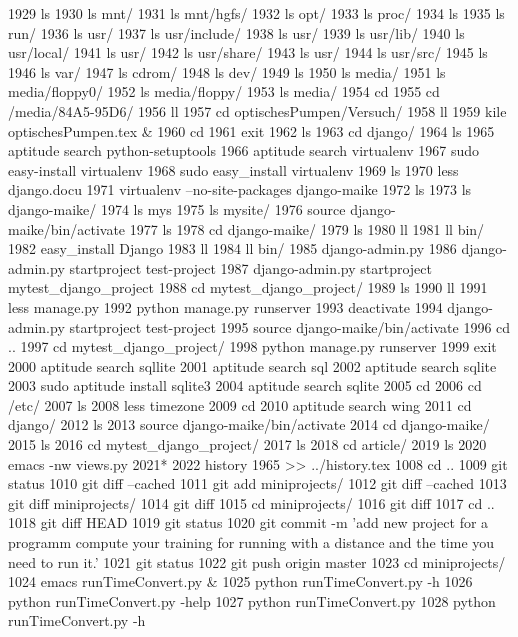  1929  ls
 1930  ls mnt/
 1931  ls mnt/hgfs/
 1932  ls opt/
 1933  ls proc/
 1934  ls
 1935  ls run/
 1936  ls usr/
 1937  ls usr/include/
 1938  ls usr/
 1939  ls usr/lib/
 1940  ls usr/local/
 1941  ls usr/
 1942  ls usr/share/
 1943  ls usr/
 1944  ls usr/src/
 1945  ls
 1946  ls var/
 1947  ls cdrom/
 1948  ls dev/
 1949  ls
 1950  ls media/
 1951  ls media/floppy0/
 1952  ls media/floppy/
 1953  ls media/
 1954  cd
 1955  cd /media/84A5-95D6/
 1956  ll
 1957  cd optischesPumpen/Versuch/
 1958  ll
 1959  kile optischesPumpen.tex &
 1960  cd
 1961  exit
 1962  ls 
 1963  cd django/
 1964  ls
 1965  aptitude search python-setuptools
 1966  aptitude search virtualenv
 1967  sudo easy-install virtualenv
 1968  sudo easy_install virtualenv
 1969  ls
 1970  less django.docu
 1971  virtualenv --no-site-packages django-maike
 1972  ls
 1973  ls django-maike/
 1974  ls mys
 1975  ls mysite/
 1976  source django-maike/bin/activate
 1977  ls
 1978  cd django-maike/
 1979  ls
 1980  ll
 1981  ll bin/
 1982  easy_install Django
 1983  ll
 1984  ll bin/
 1985  django-admin.py 
 1986  django-admin.py startproject test-project
 1987  django-admin.py startproject mytest_django_project
 1988  cd mytest_django_project/
 1989  ls
 1990  ll
 1991  less manage.py 
 1992  python manage.py runserver
 1993  deactivate
 1994  django-admin.py startproject test-project
 1995  source django-maike/bin/activate
 1996  cd ..
 1997  cd mytest_django_project/
 1998  python manage.py runserver
 1999  exit
 2000  aptitude search sqllite
 2001  aptitude search sql
 2002  aptitude search sqlite
 2003  sudo aptitude install sqlite3
 2004  aptitude search sqlite
 2005  cd
 2006  cd /etc/
 2007  ls
 2008  less timezone 
 2009  cd
 2010  aptitude search wing
 2011  cd django/
 2012  ls
 2013  source django-maike/bin/activate
 2014  cd django-maike/
 2015  ls
 2016  cd mytest_django_project/
 2017  ls
 2018  cd article/
 2019  ls
 2020  emacs -nw views.py 
 2021* 
 2022  history 1965 >> ../history.tex 
 1008  cd ..
 1009  git status
 1010  git diff --cached
 1011  git add miniprojects/
 1012  git diff --cached
 1013  git diff miniprojects/
 1014  git diff
 1015  cd miniprojects/
 1016  git diff
 1017  cd ..
 1018  git diff HEAD
 1019  git status
 1020  git commit -m 'add new project for a programm compute your training for running with a distance and the time you need to run it.'
 1021  git status
 1022  git push origin master
 1023  cd miniprojects/
 1024  emacs runTimeConvert.py &
 1025  python runTimeConvert.py -h
 1026  python runTimeConvert.py -help
 1027  python runTimeConvert.py
 1028  python runTimeConvert.py -h
